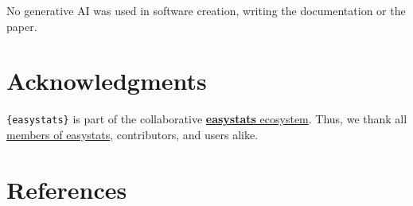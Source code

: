 \documentclass{article}
\begin{document}
No generative AI was used in software creation, writing the
documentation or the paper.

\section{Acknowledgments}\label{acknowledgments}

\texttt{\{easystats\}} is part of the collaborative
\href{https://easystats.github.io/easystats/}{\textbf{easystats}
ecosystem}. Thus, we thank all
\href{https://github.com/orgs/easystats/people}{members of easystats},
contributors, and users alike.

\section*{References}\label{references}
\end{document}
